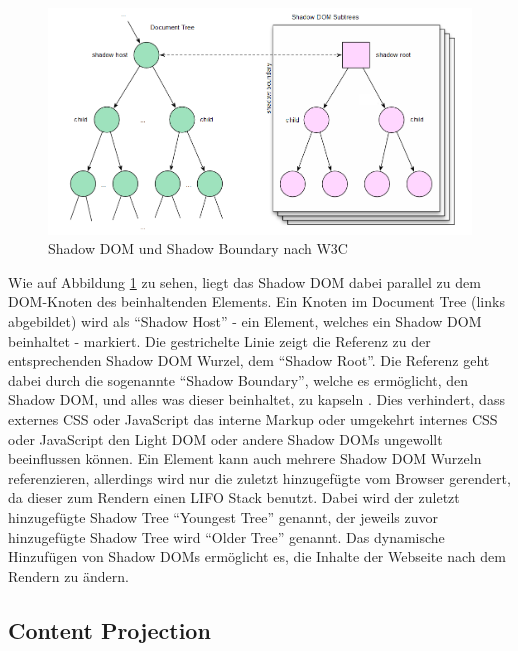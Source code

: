 \begin{figure}[htbp]
 \centering
 \includegraphics[width=\linewidth]{kapitel2/bilder/3-shadow-dom-shadow-boundary}
 \caption{Shadow \ac{DOM} und Shadow Boundary nach W3C}
 \label{fig:sdsbnw3c}
\end{figure}

Wie auf Abbildung \ref{fig:sdsbnw3c} zu sehen, liegt das Shadow \ac{DOM} dabei parallel zu dem \ac{DOM}-Knoten des beinhaltenden Elements. Ein Knoten im Document Tree (links abgebildet) wird als ``Shadow Host'' - ein Element, welches ein Shadow \ac{DOM} beinhaltet - markiert. Die gestrichelte Linie zeigt die Referenz zu der entsprechenden Shadow \ac{DOM} Wurzel, dem ``Shadow Root''. Die Referenz geht dabei durch die sogenannte ``Shadow Boundary'', welche es ermöglicht, den Shadow \ac{DOM}, und alles was dieser beinhaltet, zu kapseln \cite{citeulike:13851350}. Dies verhindert, dass externes \ac{CSS} oder JavaScript das interne Markup oder umgekehrt internes \ac{CSS} oder JavaScript den Light \ac{DOM} oder andere Shadow \ac{DOM}s ungewollt beeinflussen können. Ein Element kann auch mehrere Shadow \ac{DOM} Wurzeln referenzieren, allerdings wird nur die zuletzt hinzugefügte vom Browser gerendert, da dieser zum Rendern einen \ac{LIFO} Stack benutzt. Dabei wird der zuletzt hinzugefügte Shadow Tree ``Youngest Tree'' genannt, der jeweils zuvor hinzugefügte Shadow Tree wird ``Older Tree'' genannt. Das dynamische Hinzufügen von Shadow \ac{DOM}s ermöglicht es, die Inhalte der Webseite nach dem Rendern zu ändern.


\subsection{Content Projection}\label{content-projection}

